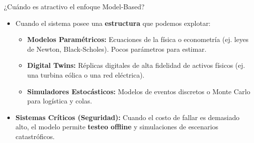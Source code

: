 \documentclass[xcolor=dvipsnames, handout]{beamer}
\begin{document}
\begin{frame}{¿Cu\'ando es atractivo el enfoque Model-Based?}


\begin{itemize}
    \item<1->Cuando el sistema posee una \textbf{estructura} que podemos explotar:
    \begin{itemize}
        \item<2-> \textbf{Modelos Param\'etricos:} Ecuaciones de la f\'isica o econometr\'ia (ej. leyes de Newton, Black-Scholes). Pocos par\'ametros para estimar.
        \item<3-> \textbf{Digital Twins:} R\'eplicas digitales de alta fidelidad de activos f\'isicos (ej. una turbina e\'olica o una red el\'ectrica).
        \item<4-> \textbf{Simuladores Estoc\'asticos:} Modelos de eventos discretos o Monte Carlo para log\'istica y colas.
    \end{itemize}

    \item<5-> \textbf{Sistemas Cr\'iticos (Seguridad):} Cuando el costo de fallar es demasiado alto, el modelo permite \textbf{testeo offline} y simulaciones de escenarios catastr\'oficos.
\end{itemize}
\end{frame}
\end{document}
